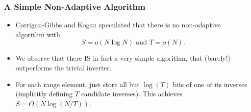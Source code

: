 \documentclass[usenames, dvipsnames, t, table]{beamer}
\begin{document}
  \begin{frame}
    \frametitle{A Simple Non-Adaptive Algorithm}
    \begin{itemize}
    \item Corrigan-Gibbs and Kogan speculated that there is no non-adaptive algorithm with
      \[S = o(N \log N) \text{ and } T = o(N).\]
      \nocite{CorriganGibbs19}
    \item We observe that there IS in fact a very simple algorithm, that (barely!) outperforms the trivial inverter.
      \pause
      \item For each range element, just store all but $\log(T)$ bits of one of its inverses (implicitly defining $T$ candidate inverses). This achieves $S = O(N \log (N / T))$.
          \mypause
    \end{itemize}
  \end{frame}
\end{document}
